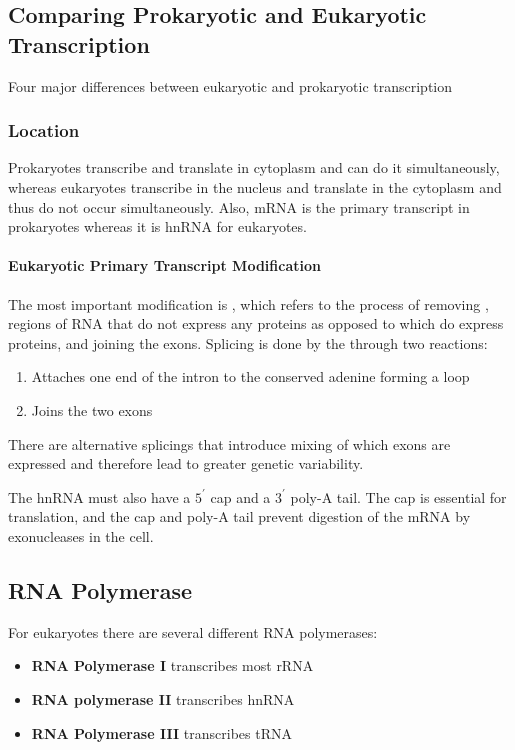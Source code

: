\documentclass[../Bio_chemistryReview.tex]{subfiles}
\begin{document}
\subsection{Comparing Prokaryotic and Eukaryotic Transcription}
Four major differences between eukaryotic and prokaryotic transcription

\subsubsection{Location}
Prokaryotes transcribe and translate in cytoplasm and can do it simultaneously,
whereas eukaryotes transcribe in the nucleus and translate in the cytoplasm and
thus do not occur simultaneously. Also, mRNA is the primary transcript in
prokaryotes whereas it is hnRNA for eukaryotes.\par

\paragraph{Eukaryotic Primary Transcript Modification}
The most important modification is , which refers to the
process of removing , regions of RNA that do not express any
proteins as opposed to  which do express proteins, and joining
the exons. Splicing is done by the  through two reactions:
\begin{enumerate}
  \item Attaches one end of the intron to the conserved adenine forming a loop
  \item Joins the two exons
\end{enumerate}
There are alternative splicings that introduce mixing of which exons are
expressed and therefore lead to greater genetic variability.\par
The hnRNA must also have a $ 5^{\prime} $ cap and a $ 3^{\prime} $ poly-A tail.
The cap is essential for translation, and the cap and poly-A tail prevent
digestion of the mRNA by exonucleases in the cell.

\subsection{RNA Polymerase}
For eukaryotes there are several different RNA polymerases:
\begin{itemize}
  \item \textbf{RNA Polymerase I} transcribes most rRNA
  \item \textbf{RNA polymerase II} transcribes hnRNA
  \item \textbf{RNA Polymerase III} transcribes tRNA
\end{itemize}
\end{document}
